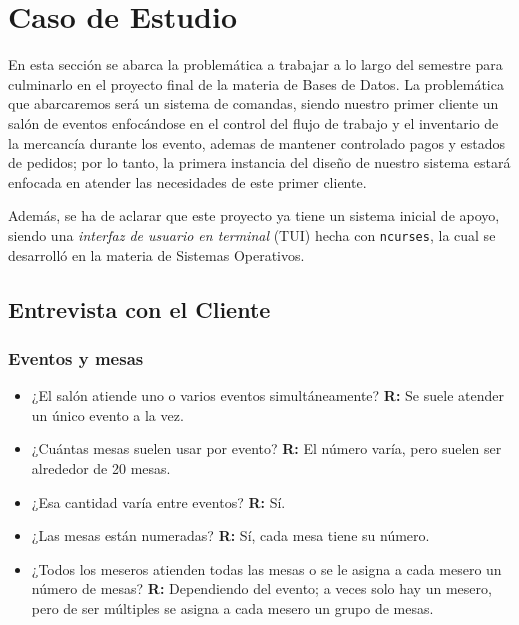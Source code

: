 \newpage

\section{Caso de Estudio}

En esta sección se abarca la problemática a trabajar a lo largo del semestre para culminarlo en el proyecto final de la materia de Bases de Datos. La problemática que abarcaremos será un sistema de comandas, siendo nuestro primer cliente un salón de eventos enfocándose en el control del flujo de trabajo y el inventario de  la mercancía durante los evento, ademas de mantener controlado pagos y estados de pedidos; por lo tanto, la primera instancia del diseño de nuestro sistema estará enfocada en atender las necesidades de este primer cliente.

Además, se ha de aclarar que este proyecto ya tiene un sistema inicial de apoyo, siendo una \emph{interfaz de usuario en terminal} (TUI) hecha con \texttt{ncurses}, la cual se desarrolló en la materia de Sistemas Operativos.

\subsection{Entrevista con el Cliente}

\subsubsection{Eventos y mesas}

\begin{itemize}
    \item ¿El salón atiende uno o varios eventos simultáneamente?
    \subitem \textbf{R:} Se suele atender un único evento a la vez.

    \item ¿Cuántas mesas suelen usar por evento?
    \subitem \textbf{R:} El número varía, pero suelen ser alrededor de 20 mesas.

    \item ¿Esa cantidad varía entre eventos?
    \subitem \textbf{R:} Sí.

    \item ¿Las mesas están numeradas?
    \subitem \textbf{R:} Sí, cada mesa tiene su número.

    \item ¿Todos los meseros atienden todas las mesas o se le asigna a cada mesero un número de mesas?
    \subitem \textbf{R:} Dependiendo del evento; a veces solo hay un mesero, pero de ser múltiples se asigna a cada mesero un grupo de mesas.
\end{itemize}

